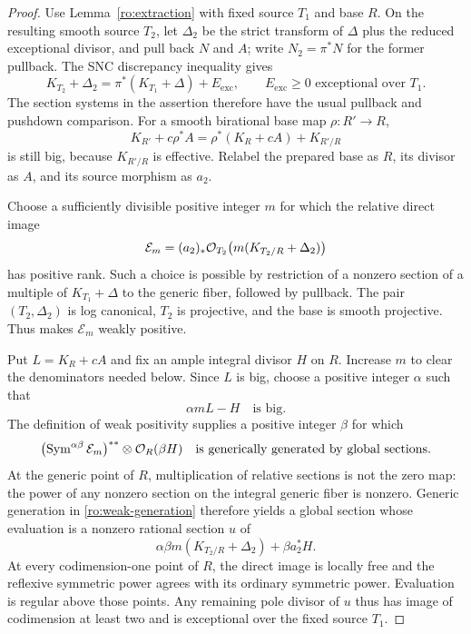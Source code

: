 \begin{proof}
Use Lemma~\ref{ro:extraction} with fixed source $T_1$ and base $R$.
On the resulting smooth source $T_2$, let $\Delta_2$ be the strict
transform of $\Delta$ plus the reduced exceptional divisor, and pull
back $N$ and $A$; write $N_2=\pi^*N$ for the former pullback.
The SNC discrepancy inequality gives
\[
 K_{T_2}+\Delta_2
   =\pi^*(K_{T_1}+\Delta)+E_{\mathrm{exc}},
 \qquad E_{\mathrm{exc}}\ge0\text{ exceptional over }T_1.
\]
The section systems in the assertion therefore have the usual
pullback and pushdown comparison.  For a smooth birational base map
$\rho:R'\to R$,
\[
 K_{R'}+c\rho^*A
   =\rho^*(K_R+cA)+K_{R'/R}
\]
is still big, because $K_{R'/R}$ is effective.  Relabel the prepared
base as $R$, its divisor as $A$, and its source morphism as $a_2$.

Choose a sufficiently divisible positive integer $m$ for which the
relative direct image
\[
 \mathcal E_m
   =(a_2)_*\mathcal O_{T_2}
          \bigl(m(K_{T_2/R}+\Delta_2)\bigr)
\]
has positive rank.  Such a choice is possible by restriction of a
nonzero section of a multiple of $K_{T_1}+\Delta$ to the generic fiber,
followed by pullback.  The pair $(T_2,\Delta_2)$ is log canonical,
$T_2$ is projective, and the base is smooth projective.  Thus
\cite[Theorem 1.1]{FujinoWeakPositivity} makes $\mathcal E_m$ weakly positive.

Put $L=K_R+cA$ and fix an ample integral divisor $H$ on $R$.  Increase
$m$ to clear the denominators needed below.  Since $L$ is big, choose a
positive integer $\alpha$ such that
\[
 \alpha mL-H\quad\text{is big}.
\]
The definition of weak positivity
\cite[Definition 7.2]{FujinoWeakPositivity} supplies a positive integer $\beta$ for
which
\begin{equation}
 \bigl(\operatorname{Sym}^{\alpha\beta}\mathcal E_m\bigr)^{**}
       \otimes\mathcal O_R(\beta H)
 \quad\text{is generically generated by global sections}.
 \label{ro:weak-generation}
\end{equation}
At the generic point of $R$, multiplication of relative sections is
not the zero map: the power of any nonzero section on the integral
generic fiber is nonzero.  Generic generation in
\eqref{ro:weak-generation} therefore yields a global section whose
evaluation is a nonzero rational section $u$ of
\[
 \alpha\beta m(K_{T_2/R}+\Delta_2)+\beta a_2^*H.
\]
At every codimension-one point of $R$, the direct image is locally
free and the reflexive symmetric power agrees with its ordinary
symmetric power.  Evaluation is regular above those points.  Any
remaining pole divisor of $u$ thus has image of codimension at least
two and is exceptional over the fixed source $T_1$.


\end{proof}
